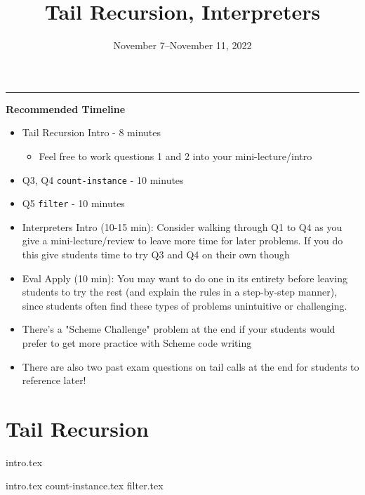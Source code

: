 \documentclass{exam}
\title{Tail Recursion, Interpreters}
\date{November 7--November 11, 2022}
\begin{document}
\maketitle
\rule{\textwidth}{0.15em}
\fontsize{12}{15}\selectfont

\begin{guide}
\begin{blocksection}
    \textbf{Recommended Timeline}
    \begin{itemize}
        \item Tail Recursion Intro - 8 minutes
        \begin{itemize}
            \item Feel free to work questions 1 and 2 into your mini-lecture/intro
        \end{itemize}
        \item Q3, Q4 \lstinline{count-instance} - 10 minutes
        \item Q5 \lstinline{filter} - 10 minutes
        \item Interpreters Intro (10-15 min): Consider walking through Q1 to Q4 as 
        you give a mini-lecture/review to leave more time for later problems. If you do this give students time to try 
        Q3 and Q4 on their own though
        \item Eval Apply (10 min): You may want to do one in its entirety before leaving students to try the rest
        (and explain the rules in a step-by-step manner), since students often find these types of problems unintuitive or challenging.
        \item There's a "Scheme Challenge" problem at the end if your students would prefer to get more practice with Scheme code writing
        \item There are also two past exam questions on tail calls at the end for students to reference later!
    \end{itemize}
\end{blocksection}
\newpage
\end{guide}

\section{Tail Recursion}
{intro.tex}
\begin{questions}
{intro.tex}
\newpage
{count-instance.tex}
{filter.tex}
\end{questions}
\end{document}
